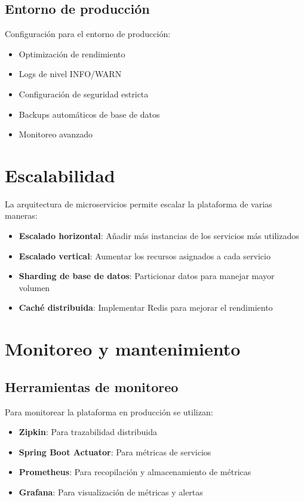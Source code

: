 \documentclass[12pt,a4paper]{report}
\begin{document}
\subsection{Entorno de producción}
Configuración para el entorno de producción:

\begin{itemize}
    \item Optimización de rendimiento
    \item Logs de nivel INFO/WARN
    \item Configuración de seguridad estricta
    \item Backups automáticos de base de datos
    \item Monitoreo avanzado
\end{itemize}

\section{Escalabilidad}
La arquitectura de microservicios permite escalar la plataforma de varias maneras:

\begin{itemize}
    \item \textbf{Escalado horizontal}: Añadir más instancias de los servicios más utilizados
    \item \textbf{Escalado vertical}: Aumentar los recursos asignados a cada servicio
    \item \textbf{Sharding de base de datos}: Particionar datos para manejar mayor volumen
    \item \textbf{Caché distribuida}: Implementar Redis para mejorar el rendimiento
\end{itemize}

\section{Monitoreo y mantenimiento}
\subsection{Herramientas de monitoreo}
Para monitorear la plataforma en producción se utilizan:

\begin{itemize}
    \item \textbf{Zipkin}: Para trazabilidad distribuida
    \item \textbf{Spring Boot Actuator}: Para métricas de servicios
    \item \textbf{Prometheus}: Para recopilación y almacenamiento de métricas
    \item \textbf{Grafana}: Para visualización de métricas y alertas
\end{itemize}
\end{document}

